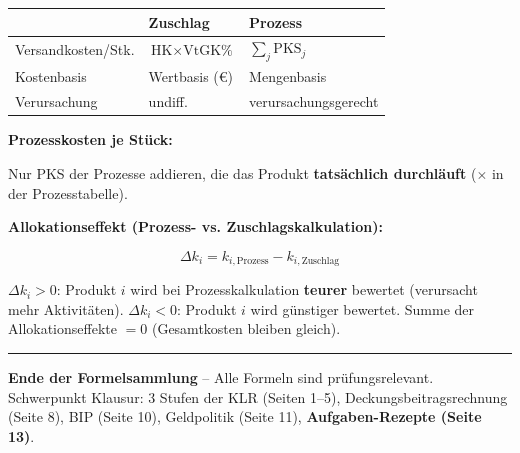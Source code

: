 \documentclass[10pt,a4paper]{article}
\begin{document}
\begin{multicols}{2}
\begin{tabular}{|L{3cm}|L{1.8cm}|L{2cm}|}
\hline
{}
& \textbf{Zuschlag} & \textbf{Prozess} \\
\hline
Versandkosten/Stk. & $\text{HK} \times \text{VtGK\%}$ & $\displaystyle\sum_j \text{PKS}_j$ \\
Kostenbasis & Wertbasis (€) & Mengenbasis \\
Verursachung & undiff. & verursachungs\-gerecht \\
\hline
\end{tabular}

\vspace{4pt}
\textbf{Prozesskosten je Stück:}
\begin{formelbox}
Nur PKS der Prozesse addieren, die das Produkt \textbf{tatsächlich durchläuft} ($\times$ in der Prozesstabelle).
\end{formelbox}

\vspace{4pt}
\textbf{Allokationseffekt (Prozess- vs. Zuschlagskalkulation):}
\begin{formelbox}
\[
\Delta k_i = k_{i,\text{Prozess}} - k_{i,\text{Zuschlag}}
\]
\end{formelbox}
{\footnotesize $\Delta k_i > 0$: Produkt $i$ wird bei Prozesskalkulation \textbf{teurer} bewertet (verursacht mehr Aktivitäten). $\Delta k_i < 0$: Produkt $i$ wird günstiger bewertet. Summe der Allokationseffekte $= 0$ (Gesamtkosten bleiben gleich).}

\end{multicols}

\vspace{6pt}
{\color{bwlblue}\hrule height 1pt}
\vspace{3pt}
{\small\centering\textbf{Ende der Formelsammlung} -- Alle Formeln sind prüfungsrelevant. Schwerpunkt Klausur: 3 Stufen der KLR (Seiten 1--5), Deckungsbeitragsrechnung (Seite 8), BIP (Seite 10), Geldpolitik (Seite 11), \textbf{Aufgaben-Rezepte (Seite 13)}.}
\end{document}

